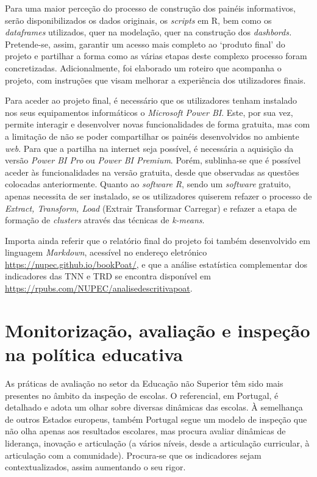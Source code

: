\documentclass[
]{book}
\begin{document}
Para uma maior perceção do processo de construção dos painéis informativos, serão disponibilizados os dados originais, os \emph{scripts} em R, bem como os \emph{dataframes} utilizados, quer na modelação, quer na construção dos \emph{dashbords.} Pretende-se, assim, garantir um acesso mais completo ao `produto final' do projeto e partilhar a forma como as várias etapas deste complexo processo foram concretizadas. Adicionalmente, foi elaborado um roteiro que acompanha o projeto, com instruções que visam melhorar a experiência dos utilizadores finais.

Para aceder ao projeto final, é necessário que os utilizadores tenham instalado nos seus equipamentos informáticos o \emph{Microsoft Power BI}. Este, por sua vez, permite interagir e desenvolver novas funcionalidades de forma gratuita, mas com a limitação de não se poder compartilhar os painéis desenvolvidos no ambiente \emph{web}. Para que a partilha na internet seja possível, é necessária a aquisição da versão \emph{Power BI Pro} ou \emph{Power BI Premium}. Porém, sublinha-se que é possível aceder às funcionalidades na versão gratuita, desde que observadas as questões colocadas anteriormente. Quanto ao \emph{software R}, sendo um \emph{software} gratuito, apenas necessita de ser instalado, se os utilizadores quiserem refazer o processo de \emph{Extract, Transform, Load} (Extrair Transformar Carregar) e refazer a etapa de formação de \emph{clusters} através das técnicas de \emph{k-means}.

Importa ainda referir que o relatório final do projeto foi também desenvolvido em linguagem \emph{Markdown}, acessível no endereço eletrónico \url{https://nupec.github.io/bookPoat/}, e que a análise estatística complementar dos indicadores das TNN e TRD se encontra disponível em \url{https://rpubs.com/NUPEC/analisedescritivapoat}.

\hypertarget{monitorizauxe7uxe3o-avaliauxe7uxe3o-e-inspeuxe7uxe3o-na-poluxedtica-educativa}{%
\section{\texorpdfstring{\textbf{Monitorização, avaliação e inspeção na política educativa}}{Monitorização, avaliação e inspeção na política educativa}}\label{monitorizauxe7uxe3o-avaliauxe7uxe3o-e-inspeuxe7uxe3o-na-poluxedtica-educativa}}

As práticas de avaliação no setor da Educação não Superior têm sido mais presentes no âmbito da inspeção de escolas. O referencial, em Portugal, é detalhado e adota um olhar sobre diversas dinâmicas das escolas. À semelhança de outros Estados europeus, também Portugal segue um modelo de inspeção que não olha apenas aos resultados escolares, mas procura avaliar dinâmicas de liderança, inovação e articulação (a vários níveis, desde a articulação curricular, à articulação com a comunidade). Procura-se que os indicadores sejam contextualizados, assim aumentando o seu rigor.
\end{document}
